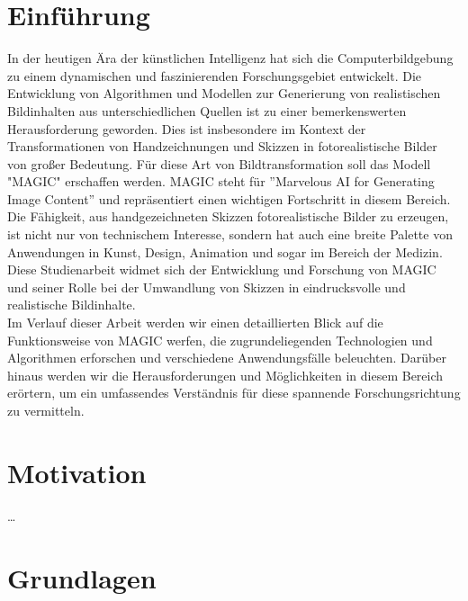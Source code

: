 \documentclass[12pt,a4paper]{article}
\begin{document}
\section{Einführung}
	In der heutigen Ära der künstlichen Intelligenz hat sich die Computerbildgebung zu einem dynamischen und faszinierenden Forschungsgebiet entwickelt. 
	Die Entwicklung von Algorithmen und Modellen zur Generierung von realistischen Bildinhalten aus unterschiedlichen Quellen ist zu einer bemerkenswerten Herausforderung geworden. 
	Dies ist insbesondere im Kontext der Transformationen von Handzeichnungen und Skizzen in fotorealistische Bilder von großer Bedeutung.
	Für diese Art von Bildtransformation soll das Modell "MAGIC" erschaffen werden.
	MAGIC steht für ''Marvelous AI for Generating Image Content'' und repräsentiert einen wichtigen Fortschritt in diesem Bereich.\\
	Die Fähigkeit, aus handgezeichneten Skizzen fotorealistische Bilder zu erzeugen, ist nicht nur von technischem Interesse, sondern hat auch eine breite Palette von Anwendungen in Kunst, Design, Animation und sogar im Bereich der Medizin. 
	Diese Studienarbeit widmet sich der Entwicklung und Forschung von MAGIC und seiner Rolle bei der Umwandlung von Skizzen in eindrucksvolle und realistische Bildinhalte.\\
	Im Verlauf dieser Arbeit werden wir einen detaillierten Blick auf die Funktionsweise von MAGIC werfen, die zugrundeliegenden Technologien und Algorithmen erforschen und verschiedene Anwendungsfälle beleuchten. 
	Darüber hinaus werden wir die Herausforderungen und Möglichkeiten in diesem Bereich erörtern, um ein umfassendes Verständnis für diese spannende Forschungsrichtung zu vermitteln.
	
\newpage
\section{Motivation}
\dots

\newpage
\section{Grundlagen}
\end{document}
